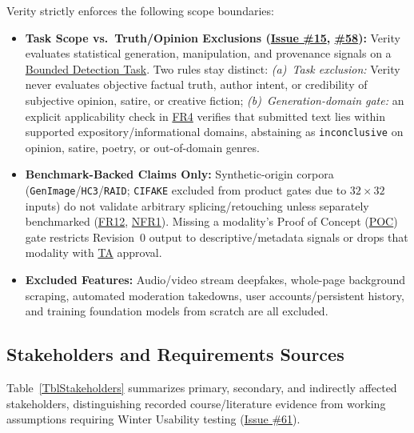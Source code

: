 \documentclass[11pt]{article}
\newcommand{\POC}{\hyperlink{acr-poc}{POC}}
\newcommand{\TA}{\hyperlink{acr-ta}{TA}}
\begin{document}
Verity strictly enforces the following scope boundaries:
\begin{itemize}[leftmargin=*, itemsep=2pt]
    \item \textbf{Task Scope vs.\ Truth/Opinion Exclusions (\href{https://github.com/richy1337/Verity/issues/15}{Issue \#15}, \href{https://github.com/richy1337/Verity/issues/58}{\#58}):} Verity evaluates statistical generation, manipulation, and provenance signals on a \hyperlink{gls-bounded-task}{Bounded Detection Task}. Two rules stay distinct: \emph{(a)~Task exclusion:} Verity never evaluates objective factual truth, author intent, or credibility of subjective opinion, satire, or creative fiction; \emph{(b)~Generation-domain gate:} an explicit applicability check in \hyperref[FR4]{FR4} verifies that submitted text lies within supported expository/informational domains, abstaining as \texttt{inconclusive} on opinion, satire, poetry, or out-of-domain genres.
    \item \textbf{Benchmark-Backed Claims Only:} Synthetic-origin corpora (\texttt{GenImage}/\texttt{HC3}/\texttt{RAID}; \texttt{CIFAKE} excluded from product gates due to $32\times32$ inputs) do not validate arbitrary splicing/retouching unless separately benchmarked (\hyperref[FR12]{FR12}, \hyperref[NFR1]{NFR1}). Missing a modality's Proof of Concept (\POC{}) gate restricts Revision~0 output to descriptive/metadata signals or drops that modality with \TA{} approval.
    \item \textbf{Excluded Features:} Audio/video stream deepfakes, whole-page background scraping, automated moderation takedowns, user accounts/persistent history, and training foundation models from scratch are all excluded.
\end{itemize}

\subsection{Stakeholders and Requirements Sources}\label{subsec:stakeholders}

Table~\ref{TblStakeholders} summarizes primary, secondary, and indirectly affected stakeholders, distinguishing recorded course/literature evidence from working assumptions requiring Winter Usability testing (\href{https://github.com/richy1337/Verity/issues/61}{Issue \#61}).
\end{document}
